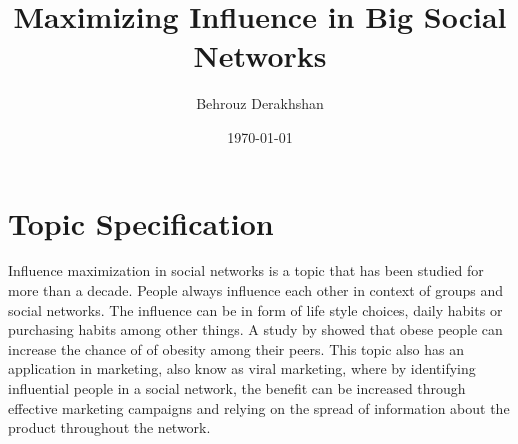 \documentclass[english]{tktltiki}
\begin{document}
\onehalfspacing

\title{Maximizing Influence in Big Social Networks}
\author{Behrouz Derakhshan}
\date{\today}

\maketitle


\section{Topic Specification}
Influence maximization in social networks is a topic that has been studied for more than a decade. People always influence each other in context of groups and social networks. The influence can be in form of life style choices, daily habits or purchasing habits among other things. A study by \cite{christ07} showed that obese people can increase the chance of of obesity among their peers. This topic also has an application in marketing, also know as viral marketing,  where by identifying influential people in a social network, the benefit can be increased through effective marketing campaigns and relying on the spread of information about the product throughout the network. 
\end{document}
